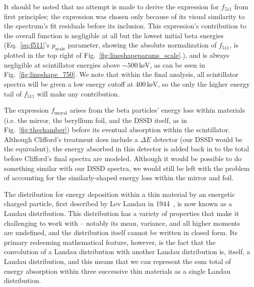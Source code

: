 It should be noted that no attempt is made to derive the expression for $f_{511}$ from first principles; the expression was chosen only because of its visual similarity to the spectrum's fit residuals before its inclusion.  This expression's contribution to the overall function is negligible at all but the lowest initial beta energies (Eq.~\ref{eq:f511}'s $p_{\mathrm{scale}}$ parameter, showing the absolute normalization of $f_{511}$, is plotted in the top right of Fig.~\ref{fig:lineshapeparams_scale}.), and is always negligible at scintillator energies above $\sim 500\,$keV, as can be seen in Fig.~\ref{fig:lineshape_750}.  We note that within the final analysis, all scintillator spectra will be given a low energy cutoff at 400\,keV, so the only the higher energy tail of $f_{511}$ will make any contribution.   

The expression $f_{\mathrm{moyal}}$ arises from the beta particles' energy loss within materials (i.e. the mirror, the beryllium foil, and the DSSD itself, as in Fig.~\ref{fig:thechamber}) before its eventual absorption within the scintillator.  Although Clifford's treatment does include a $\Delta E$ detector (our DSSD would be the equivalent), the energy absorbed in this detector is added back in to the total before Clifford's final spectra are modeled.  Although it would be possible to do something similar with our DSSD spectra,  we would still be left with the problem of accounting for the similarly-shaped energy loss within the mirror and foil. 

The distribution for energy deposition within a thin material by an energetic charged particle, first described by Lev Landau in 1944~\cite{landaudistribution}, is now known as a Landau distribution.  This distribution has a variety of properties that make it challenging to work with -- notably its mean, variance, and all higher moments are undefined, and the distribution itself cannot be written in closed form.  Its primary redeeming mathematical feature, however, is the fact that the convolution of a Landau distribution with another Landau distribution is, itself, a Landau distribution, and this means that we can represent the sum total of energy absorption within three successive thin materials as a single Landau distribution.  

